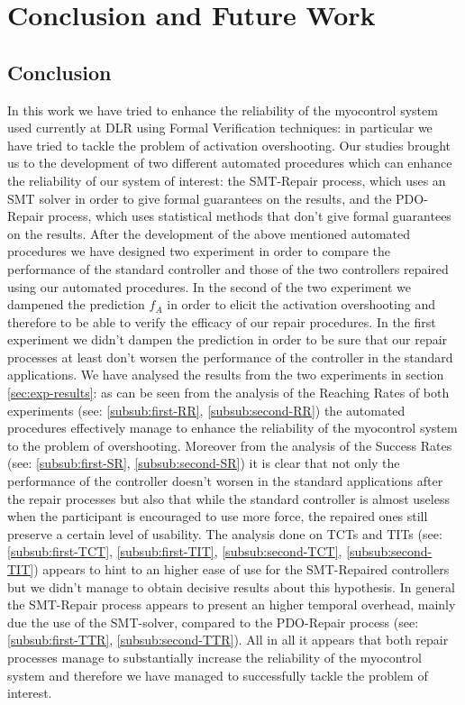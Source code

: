 \chapter{Conclusion and Future Work}\label{ch:conclusion-future}
\section{Conclusion}\label{sec:conclusion}
In this work we have tried to enhance the reliability of the myocontrol system used currently at DLR using Formal Verification techniques: in particular we have tried to tackle the problem of activation overshooting. Our studies brought us to the development of two different automated procedures which can enhance the reliability of our system of interest: the SMT-Repair process, which uses an SMT solver in order to give formal guarantees on the results, and the PDO-Repair process, which uses statistical methods that don't give formal guarantees on the results. After the development of the above mentioned automated procedures we have designed two experiment in order to compare the performance of the standard controller and those of the two controllers repaired using our automated procedures. In the second of the two experiment we dampened the prediction $f_{A}$ in order to elicit the activation overshooting and therefore to be able to verify the efficacy of our repair procedures. In the first experiment we didn't dampen the prediction in order to be sure that our repair processes at least don't worsen the performance of the controller in the standard applications.
We have analysed the results from the two experiments in section \ref{sec:exp-results}: as can be seen from the analysis of the Reaching Rates of both experiments (see: \ref{subsub:first-RR}, \ref{subsub:second-RR}) the automated procedures effectively manage to enhance the reliability of the myocontrol system to the problem of overshooting. Moreover from the analysis of the Success Rates (see: \ref{subsub:first-SR}, \ref{subsub:second-SR}) it is clear that not only the performance of the controller doesn't worsen in the standard applications after the repair processes but also that while the standard controller is almost useless when the participant is encouraged to use more force, the repaired ones still preserve a certain level of usability. The analysis done on TCTs and TITs (see: \ref{subsub:first-TCT}, \ref{subsub:first-TIT}, \ref{subsub:second-TCT}, \ref{subsub:second-TIT}) appears to hint to an higher ease of use for the SMT-Repaired controllers but we didn't manage to obtain decisive results about this hypothesis. In general the SMT-Repair process appears to present an higher temporal overhead, mainly due the use of the SMT-solver, compared to the PDO-Repair process (see: \ref{subsub:first-TTR}, \ref{subsub:second-TTR}). All in all it appears that both repair processes manage to substantially increase the reliability of the myocontrol system and therefore we have managed to successfully tackle the problem of interest.
